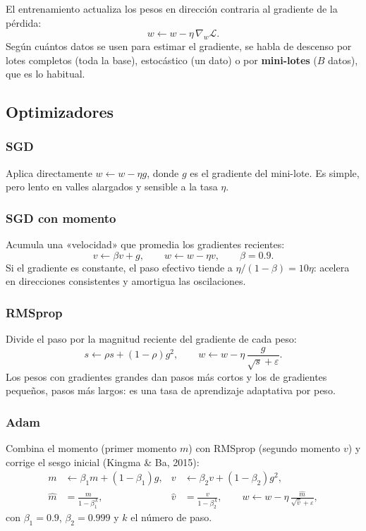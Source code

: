 \documentclass[11pt,a4paper]{article}
\begin{document}
El entrenamiento actualiza los pesos en dirección contraria al gradiente de la pérdida:
\begin{equation}
w \leftarrow w - \eta\,\nabla_w \mathcal{L}.
\end{equation}
Según cuántos datos se usen para estimar el gradiente, se habla de descenso por lotes completos (toda la base), estocástico (un dato) o por \textbf{mini-lotes} ($B$ datos), que es lo habitual.

\subsection{Optimizadores}

\subsubsection{SGD}
Aplica directamente $w \leftarrow w - \eta g$, donde $g$ es el gradiente del mini-lote. Es simple, pero lento en valles alargados y sensible a la tasa $\eta$.

\subsubsection{SGD con momento}
Acumula una «velocidad» que promedia los gradientes recientes:
\begin{equation}
v \leftarrow \beta v + g, \qquad w \leftarrow w - \eta v, \qquad \beta=0.9 .
\end{equation}
Si el gradiente es constante, el paso efectivo tiende a $\eta/(1-\beta)=10\eta$: acelera en direcciones consistentes y amortigua las oscilaciones.

\subsubsection{RMSprop}
Divide el paso por la magnitud reciente del gradiente de cada peso:
\begin{equation}
s \leftarrow \rho s + (1-\rho)g^2, \qquad w \leftarrow w - \eta\,\frac{g}{\sqrt{s}+\varepsilon}.
\end{equation}
Los pesos con gradientes grandes dan pasos más cortos y los de gradientes pequeños, pasos más largos: es una tasa de aprendizaje adaptativa por peso.

\subsubsection{Adam}
Combina el momento (primer momento $m$) con RMSprop (segundo momento $v$) y corrige el sesgo inicial (Kingma \& Ba, 2015):
\begin{align}
m &\leftarrow \beta_1 m + (1-\beta_1) g, & v &\leftarrow \beta_2 v + (1-\beta_2) g^2,\\
\hat m &= \frac{m}{1-\beta_1^{\,k}}, & \hat v &= \frac{v}{1-\beta_2^{\,k}}, \qquad
w \leftarrow w - \eta\,\frac{\hat m}{\sqrt{\hat v}+\varepsilon},
\end{align}
con $\beta_1=0.9$, $\beta_2=0.999$ y $k$ el número de paso.
\end{document}
